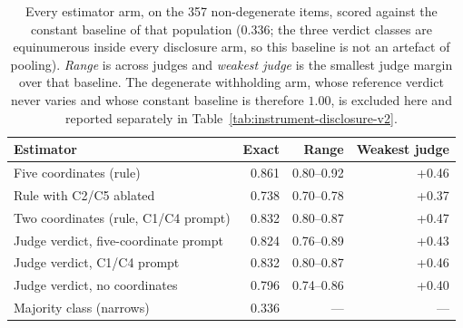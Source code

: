 \begin{table}[t]
\centering\scriptsize
\setlength{\tabcolsep}{3pt}
\begin{tabular}{@{}lrrr@{}}
\toprule
Estimator & Exact & Range & Weakest judge \\
\midrule
Five coordinates (rule) & 0.861 & 0.80--0.92 & +0.46 \\
Rule with C2/C5 ablated & 0.738 & 0.70--0.78 & +0.37 \\
Two coordinates (rule, C1/C4 prompt) & 0.832 & 0.80--0.87 & +0.47 \\
Judge verdict, five-coordinate prompt & 0.824 & 0.76--0.89 & +0.43 \\
Judge verdict, C1/C4 prompt & 0.832 & 0.80--0.87 & +0.46 \\
Judge verdict, no coordinates & 0.796 & 0.74--0.86 & +0.40 \\
Majority class (narrows) & 0.336 & --- & --- \\
\bottomrule
\end{tabular}
\caption{Every estimator arm, on the 357 non-degenerate items, scored against the constant baseline of that population (0.336; the three verdict classes are equinumerous inside every disclosure arm, so this baseline is not an artefact of pooling). \emph{Range} is across judges and \emph{weakest judge} is the smallest judge margin over that baseline. The degenerate withholding arm, whose reference verdict never varies and whose constant baseline is therefore $1.00$, is excluded here and reported separately in Table~\ref{tab:instrument-disclosure-v2}.}
\label{tab:instrument-baselines-v2}
\end{table}
